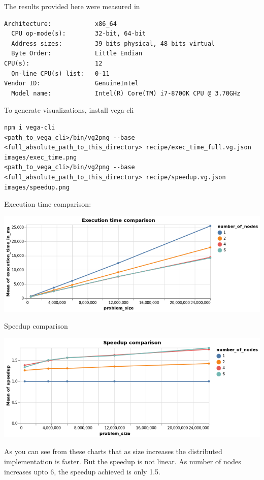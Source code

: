 \documentclass[11pt]{article}
\begin{document}
The results provided here were measured in
\begin{verbatim}
Architecture:            x86_64
  CPU op-mode(s):        32-bit, 64-bit
  Address sizes:         39 bits physical, 48 bits virtual
  Byte Order:            Little Endian
CPU(s):                  12
  On-line CPU(s) list:   0-11
Vendor ID:               GenuineIntel
  Model name:            Intel(R) Core(TM) i7-8700K CPU @ 3.70GHz
\end{verbatim}

To generate visualizations, install vega-cli
\begin{verbatim}
npm i vega-cli
<path_to_vega_cli>/bin/vg2png --base <full_absolute_path_to_this_directory> recipe/exec_time_full.vg.json images/exec_time.png 
<path_to_vega_cli>/bin/vg2png --base <full_absolute_path_to_this_directory> recipe/speedup.vg.json images/speedup.png 
\end{verbatim}

Execution time comparison:
\begin{center}
\includegraphics[width=.9\linewidth]{./images/exec_time.png}
\end{center}

Speedup comparison
\begin{center}
\includegraphics[width=.9\linewidth]{./images/speedup.png}
\end{center}

As you can see from these charts that as size increases the
distributed implementation is faster. But the speedup is not linear.
As number of nodes increases upto 6, the speedup achieved is only 1.5.
\end{document}
